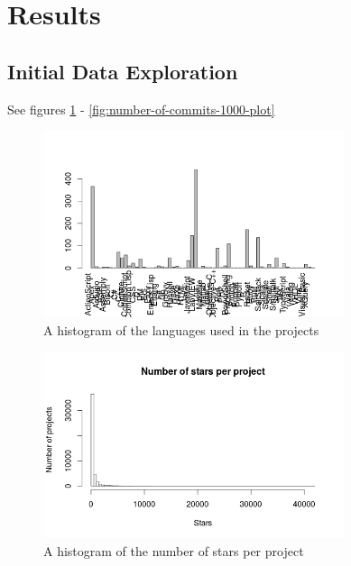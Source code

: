 \section{Results}
    \subsection{Initial Data Exploration}
    	See figures \ref{fig:language-frequency-plot} - \ref{fig:number-of-commits-1000-plot}
	    \begin{figure}
	        \includegraphics[width=250pt]{figures/language-frequency}
	        \caption{A histogram of the languages used in the projects}
	        \label{fig:language-frequency-plot}
	    \end{figure}

	    
	    \begin{figure}
	        \includegraphics[width=250pt]{figures/star-distribution}
	        \caption{A histogram of the  number of stars per project}
	        \label{fig:star-distribution-plot}
	    \end{figure}
	    
